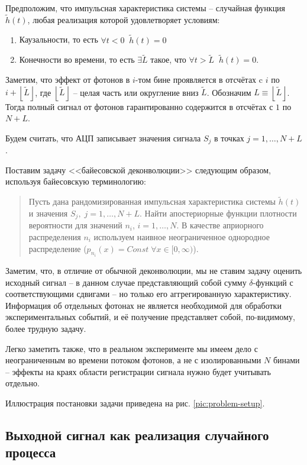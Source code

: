 \documentclass[12pt]{article}
\begin{document}
	Предположим, что импульсная характеристика системы -- случайная функция $\tilde{h}(t)$, любая реализация которой удовлетворяет условиям: 
	\begin{enumerate}
		\item Каузальности, то есть $\forall t < 0 \; \; \tilde{h}(t) = 0$
		\item Конечности во времени, то есть $\exists \tilde{L}$ такое, что $\forall t > \tilde{L} \; \; \tilde{h}(t) = 0$.
	\end{enumerate}

	Заметим, что эффект от фотонов в $i$-том бине проявляется в отсчётах c $i$ по $i + \left \lfloor{\tilde{L}}\right \rfloor$, где $\left \lfloor{\tilde{L}}\right \rfloor$ -- целая часть или округление вниз $\tilde{L}$. Обозначим $L \equiv \left \lfloor{\tilde{L}}\right \rfloor$. Тогда полный сигнал от фотонов гарантированно содержится в отсчётах с $1$ по $N + L$.
	
	Будем считать, что АЦП записывает значения сигнала $S_j$ в точках $j = 1, \ldots, N + L$.
	
	Поставим задачу <<байесовской деконволюции>> следующим образом, используя байесовскую терминологию:
	
	\begin{quote}
		Пусть дана рандомизированная импульсная характеристика системы $\tilde{h}(t)$ и значения $S_j, \; j = 1, \ldots, N + L$. Найти апостериорные функции плотности вероятности для значений $n_i$, $i = 1, \ldots, N$. В качестве априорного распределения $n_i$ используем наивное неограниченное однородное распределение ($p_{n_i}(x) = Const \; \forall x \in [0, \infty)$).
	\end{quote}
	
	Заметим, что, в отличие от обычной деконволюции, мы не ставим задачу оценить исходный сигнал -- в данном случае представляющий собой сумму $\delta$-функций с соответствующими сдвигами -- но только его аггрегированную характеристику. Информация об отдельных фотонах не является необходимой для обработки экспериментальных событий, и её получение представляет собой, по-видимому, более трудную задачу.
	
	Легко заметить также, что в реальном эксперименте мы имеем дело с неограниченным во времени потоком фотонов, а не с изолированными $N$ бинами -- эффекты на краях области регистрации сигнала нужно будет учитывать отдельно.
	
	Иллюстрация постановки задачи приведена на рис. \ref{pic:problem-setup}.

	\subsection{Выходной сигнал как реализация случайного процесса}
\end{document}
